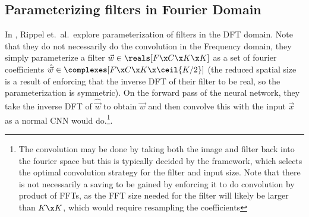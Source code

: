 \subsection{Parameterizing filters in Fourier Domain}
In  \cite{rippel_spectral_2015}, Rippel et.\
al.\ explore parameterization of filters in the DFT domain.  Note that they do
not necessarily do the convolution in the Frequency
domain, they simply parameterize a filter $\vec{w} \in \reals[F\x C\x K\x K]$ as
a set of fourier coefficients $\hat{\vec{w}} \in \complexes[F\x C\x K \x \ceil{K/2}]$
(the reduced spatial size is a result of enforcing that the inverse DFT of their
filter to be real, so the parameterization is symmetric). On the forward pass of
the neural network, they take the inverse DFT of $\hat{\vec{w}}$ to obtain
$\vec{w}$ and then convolve this with the input $\vec{x}$ as a normal CNN
would do.\footnote{The convolution may be done by taking both the image and
filter back into the fourier space but this is typically decided by the
framework, which selects the optimal convolution strategy for the filter and
input size. Note that there is not necessarily a saving to be gained by
enforcing it to do convolution by product of FFTs, as the FFT size needed for
the filter will likely be larger than $K\x K$, which would require resampling
the coefficients}. 



